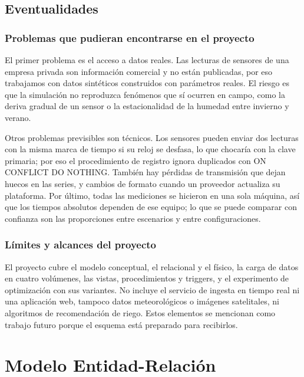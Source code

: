 \documentclass[11pt,letterpaper]{article}
\newcommand{\tbus}{\textunderscore\allowbreak}
\newcommand{\tb}[1]{{\ttfamily\let\_\tbus #1}}
\begin{document}
\subsection{Eventualidades}

\subsubsection{Problemas que pudieran encontrarse en el proyecto}

El primer problema es el acceso a datos reales. Las lecturas de sensores de una empresa privada son información comercial y no están publicadas, por eso trabajamos con datos sintéticos construidos con parámetros reales. El riesgo es que la simulación no reproduzca fenómenos que sí ocurren en campo, como la deriva gradual de un sensor o la estacionalidad de la humedad entre invierno y verano.

Otros problemas previsibles son técnicos. Los sensores pueden enviar dos lecturas con la misma marca de tiempo si su reloj se desfasa, lo que chocaría con la clave primaria; por eso el procedimiento de registro ignora duplicados con \tb{ON CONFLICT DO NOTHING}. También hay pérdidas de transmisión que dejan huecos en las series, y cambios de formato cuando un proveedor actualiza su plataforma. Por último, todas las mediciones se hicieron en una sola máquina, así que los tiempos absolutos dependen de ese equipo; lo que se puede comparar con confianza son las proporciones entre escenarios y entre configuraciones.

\subsubsection{Límites y alcances del proyecto}

El proyecto cubre el modelo conceptual, el relacional y el físico, la carga de datos en cuatro volúmenes, las vistas, procedimientos y triggers, y el experimento de optimización con sus variantes. No incluye el servicio de ingesta en tiempo real ni una aplicación web, tampoco datos meteorológicos o imágenes satelitales, ni algoritmos de recomendación de riego. Estos elementos se mencionan como trabajo futuro porque el esquema está preparado para recibirlos.

\section{Modelo Entidad-Relación}
\end{document}
